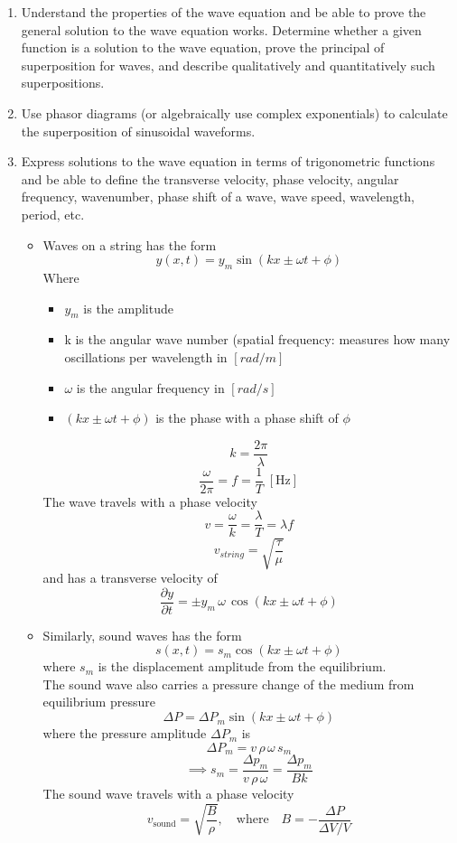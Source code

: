 \documentclass[12pt]{article}
\begin{document}
\begin{enumerate}
    \item Understand the properties of the wave equation and be able to prove the general solution to the wave equation works. Determine whether a given function is a solution to the wave equation, prove the principal of superposition for waves, and describe qualitatively and quantitatively such superpositions.
    \item Use phasor diagrams (or algebraically use complex exponentials) to calculate the superposition of sinusoidal waveforms.
\newpage
    \item Express solutions to the wave equation in terms of trigonometric functions and be able to define the transverse velocity, phase velocity, angular frequency, wavenumber, phase shift of a wave, wave speed, wavelength, period, etc.
\begin{itemize}
     \item Waves on a string has the form
\[
y(x,t) = y_m \sin(kx \pm \omega t + \phi)
\]
Where
    \begin{itemize}
\item $y_m$ is the amplitude
\item k is the angular wave number (spatial frequency: measures how many oscillations per wavelength in $[rad/m]$
\item $\omega$ is the angular frequency in $[rad/s]$
\item $(kx \pm \omega t+\phi)$ is the phase with a phase shift of $\phi$
    \end{itemize}
\[
k = \frac{2 \pi}{\lambda}
\]
\[
\frac{\omega}{2\pi} = f = \frac{1}{T} \; [\text{Hz}]
\]
The wave travels with a phase velocity
\[
v = \frac{\omega}{k} = \frac{\lambda}{T} = \lambda f
\]
\[
v_{string} = \sqrt{\frac{\tau}{\mu}}
\]
and has a transverse velocity of
\[
\frac{\partial y}{\partial t} = \pm y_m \, \omega \, \cos(kx \pm \omega t + \phi)
\]
\item Similarly, sound waves has the form
\[
s(x,t) = s_m \cos(kx \pm \omega t + \phi)
\]
where $s_m$ is the displacement amplitude from the equilibrium.\\
The sound wave also carries a pressure change of the medium from equilibrium pressure
\[
\Delta P = \Delta P_m \sin(kx \pm \omega t + \phi)
\]
where the pressure amplitude $\Delta P_m$ is
\[
\Delta P_m = v \, \rho \,  \omega \, s_m
\]
\[\implies s_m = \frac{\Delta p_m}{v \, \rho \, \omega} = \frac{\Delta p_m}{Bk}\]
The sound wave travels with a phase velocity
\[
v_{\text{sound}} = \sqrt{\frac{B}{\rho}}, \quad \text{where} \quad B = - \frac{\Delta P}{\Delta V / V}
\]
\end{itemize}
\end{enumerate}
\end{document}
